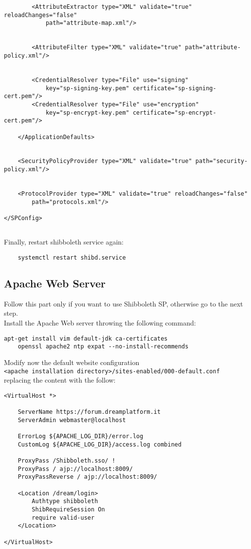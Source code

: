 \begin{verbatim}
        <AttributeExtractor type="XML" validate="true" reloadChanges="false" 
            path="attribute-map.xml"/>

       
        <AttributeFilter type="XML" validate="true" path="attribute-policy.xml"/>

    
        <CredentialResolver type="File" use="signing"
            key="sp-signing-key.pem" certificate="sp-signing-cert.pem"/>
        <CredentialResolver type="File" use="encryption"
            key="sp-encrypt-key.pem" certificate="sp-encrypt-cert.pem"/>

    </ApplicationDefaults>

    
    <SecurityPolicyProvider type="XML" validate="true" path="security-policy.xml"/>

    
    <ProtocolProvider type="XML" validate="true" reloadChanges="false" 
        path="protocols.xml"/>

</SPConfig>


\end{verbatim}

Finally, restart shibboleth service again:
\begin{verbatim}
    systemctl restart shibd.service 
\end{verbatim}

\subsection{Apache Web Server}
Follow this part only if you want to use Shibboleth SP, otherwise go to the next step.\\
Install the Apache Web server throwing the following command:
\begin{verbatim}
apt-get install vim default-jdk ca-certificates 
    openssl apache2 ntp expat --no-install-recommends
\end{verbatim}

Modify now the default website configuration\\ \texttt{<apache installation directory>/sites-enabled/000-default.conf}\\ replacing the content with the follow:
\begin{verbatim}
<VirtualHost *>
      
    ServerName https://forum.dreamplatform.it
    ServerAdmin webmaster@localhost
    
    ErrorLog ${APACHE_LOG_DIR}/error.log
    CustomLog ${APACHE_LOG_DIR}/access.log combined

    ProxyPass /Shibboleth.sso/ !
    ProxyPass / ajp://localhost:8009/
    ProxyPassReverse / ajp://localhost:8009/

    <Location /dream/login>
        Authtype shibboleth
        ShibRequireSession On
        require valid-user
    </Location>

</VirtualHost>
\end{verbatim}

